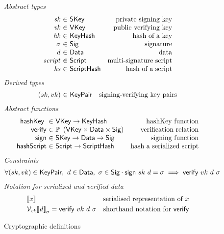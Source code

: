 \begin{figure}[htb]
  \emph{Abstract types}
  \begin{equation*}
    \begin{array}{r@{~\in~}lr}
      \var{sk} & \SKey & \text{private signing key}\\
      \var{vk} & \VKey & \text{public verifying key}\\
      \var{hk} & \KeyHash & \text{hash of a key}\\
      \sigma & \Sig  & \text{signature}\\
      \var{d} & \Data  & \text{data}\\
      \var{script} & \Script & \text{multi-signature script} \\
      \var{hs} & \HashScr & \text{hash of a script}
    \end{array}
  \end{equation*}
  \emph{Derived types}
  \begin{equation*}
    \begin{array}{r@{~\in~}lr}
      (sk, vk) & \KeyPair & \text{signing-verifying key pairs}
    \end{array}
  \end{equation*}
  \emph{Abstract functions}
  \begin{equation*}
    \begin{array}{r@{~\in~}lr}
      \hashKey{} & \VKey \to \KeyHash
                 & \text{hashKey function} \\
      \fun{verify} & \powerset{\left(\VKey \times \Data \times \Sig\right)}
                   & \text{verification relation}\\
      \fun{sign} & \SKey \to \Data \to \Sig
                 & \text{signing function}\\
      \fun{hashScript} & \Script \to \HashScr & \text{hash a serialized script}
    \end{array}
  \end{equation*}
  \emph{Constraints}
  \begin{align*}
    & \forall (sk, vk) \in \mathsf{KeyPair},~ d \in \mathsf{Data},~ \sigma \in \mathsf{Sig} \cdot
    \mathsf{sign} ~ sk ~ d = \sigma \implies \mathsf{verify} ~ vk ~ d ~ \sigma
  \end{align*}
  \emph{Notation for serialized and verified data}
  \begin{align*}
    & \llbracket \mathit{x} \rrbracket & \text{serialised representation of } x\\
    & \mathcal{V}_{\mathit{vk}}{\llbracket \mathit{d} \rrbracket}_{\sigma} = \mathsf{verify} ~ vk ~ d ~ \sigma
    & \text{shorthand notation for } \mathsf{verify}
  \end{align*}
  \caption{Cryptographic definitions}
  \label{fig:crypto-defs-shelley}
\end{figure}

